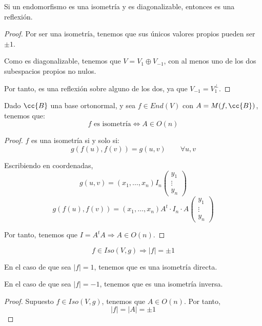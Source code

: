 \begin{prop}
    Si un endomorfismo es una isometría y es diagonalizable, entonces es una reflexión.
\end{prop}
\begin{proof}
    Por ser una isometría, tenemos que sus únicos valores propios pueden ser $\pm 1$.

    Como es diagonalizable, tenemos que $V = V_1 \oplus V_{-1}$, con al menos uno de los dos subespacios propios no nulos.
    
    Por tanto, es una reflexión sobre alguno de los dos, ya que $V_{-1}=V_1^\perp$.
\end{proof}

\begin{teo}
    Dado $\cc{B}$ una base ortonormal, y sea $f\in End(V)$ con $A=M(f, \cc{B})$, tenemos que:
    \begin{equation*}
        f \text{ es isometría} \Longleftrightarrow A\in O(n)
    \end{equation*}
\end{teo}
\begin{proof}
    $f$ es una isometría si y solo si:
    \begin{equation*}
        g(f(u), f(v))=g(u,v) \qquad \forall u,v
    \end{equation*}

    Escribiendo en coordenadas,
    \begin{equation*}
        g(u,v) = (x_1, \dots, x_n)I_n \left(\begin{array}{c}
            y_1 \\ \vdots \\ y_n
        \end{array}\right)
    \end{equation*}
    \begin{equation*}
        g(f(u), f(v)) = (x_1, \dots, x_n)A^t\cdot I_n \cdot A\left(\begin{array}{c}
            y_1 \\ \vdots \\ y_n
        \end{array}\right)
    \end{equation*}

    Por tanto, tenemos que $I=A^tA\Longrightarrow A\in O(n)$.
\end{proof}

\begin{prop}
    \begin{equation*}
        f\in Iso(V,g) \Longrightarrow |f|=\pm 1
    \end{equation*}

    En el caso de que sea $|f|=1$, tenemos que es una isometría directa.

    En el caso de que sea $|f|=-1$, tenemos que es una isometría inversa.
\end{prop}
\begin{proof}
    Supuesto $f\in Iso(V,g)$, tenemos que $A\in O(n)$. Por tanto,
    \begin{equation*}
        |f|=|A| = \pm 1
    \end{equation*}
\end{proof}



